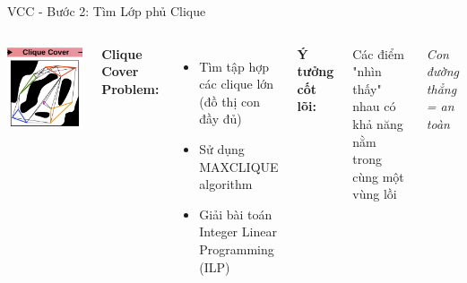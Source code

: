 \documentclass[aspectratio=169]{beamer}
\begin{document}
\begin{frame}{VCC - Bước 2: Tìm Lớp phủ Clique}
    \begin{columns}[c]
        \centering
        \includegraphics[width=\textwidth]{../imgs/VCC-2.png}

        \textbf{Clique Cover Problem:}
        \begin{itemize}
            \item Tìm tập hợp các clique lớn (đồ thị con đầy đủ)
            \item Sử dụng MAXCLIQUE algorithm
            \item Giải bài toán Integer Linear Programming (ILP)
        \end{itemize}

        \vspace{0.5em}
        \textbf{Ý tưởng cốt lõi:}
        
        Các điểm "nhìn thấy" nhau có khả năng nằm trong cùng một vùng lồi
        
        \vspace{0.2cm}
        \textit{Con đường thẳng = an toàn}
    \end{columns}
\end{frame}
\end{document}
